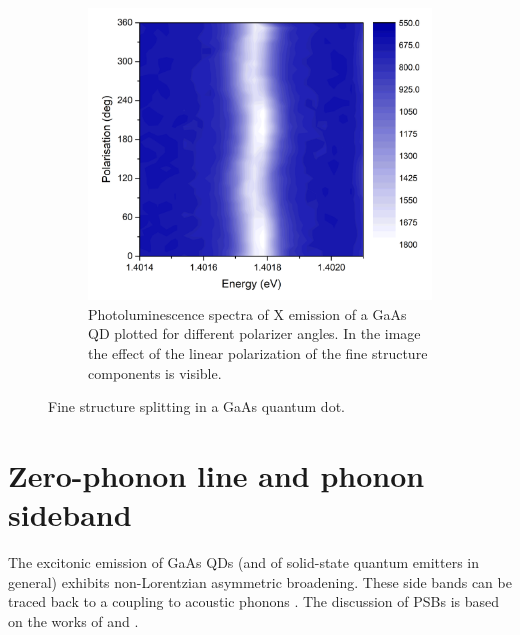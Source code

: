 \begin{figure}[H]
	\begin{subfigure}[b]{0.48\textwidth}
		\centering
		\includegraphics[width=1.05\textwidth]{figures/quantum-dot/FSS_Pol.png}
		\caption{Photoluminescence spectra of X emission of a GaAs QD plotted for different polarizer angles.
			In the image the effect of the linear polarization of the fine structure components is visible.~\cite{schimpf_towards_2017}}
		\label{fig:fss-pol}
	\end{subfigure}
	\caption{Fine structure splitting in a GaAs quantum dot.}
	\label{fig:fss}
\end{figure}


\newpage
\section{Zero-phonon line and phonon sideband}
\label{sec:zero-phonon-side-band}
The excitonic emission of GaAs \acp{QD} (and of solid-state quantum emitters in general) exhibits non-Lorentzian asymmetric broadening.
These side bands can be traced back to a coupling to acoustic phonons \cite{peter_phonon_2004}\cite{reigue_probing_2017}.
The discussion of \acp{PSB} is based on the works of \textcite{friedrich_photochemical_1984} and  \textcite{peter_phonon_2004}.

